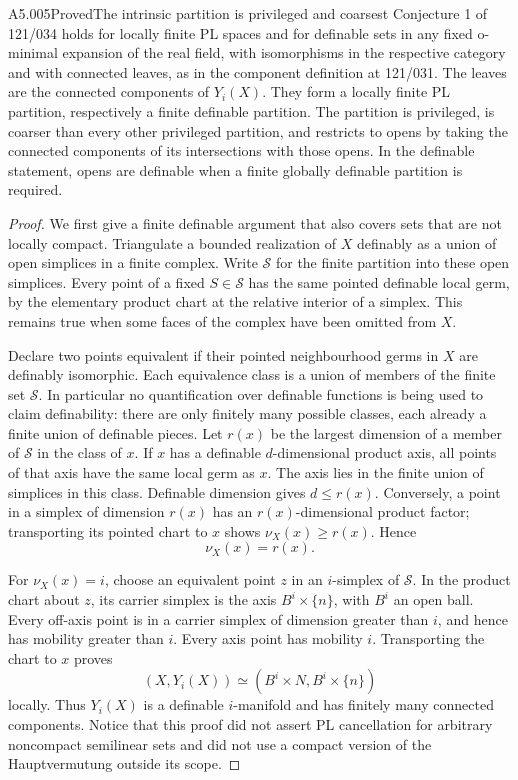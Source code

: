 \begin{saresult}{A5.005}{Proved}{The intrinsic partition is privileged and coarsest}
Conjecture 1 of 121/034 holds for locally finite PL spaces and for
definable sets in any fixed o-minimal expansion of the real field,
with isomorphisms in the respective category and with connected
leaves, as in the component definition at 121/031.  The leaves are the
connected components of $Y_i(X)$.  They form a locally finite PL
partition, respectively a finite definable partition.  The partition
is privileged, is coarser than every other privileged partition, and
restricts to opens by taking the connected components of its
intersections with those opens.  In the definable statement, opens
are definable when a finite globally definable partition is required.
\end{saresult}
\begin{proof}
We first give a finite definable argument that also covers sets that
are not locally compact.  Triangulate a bounded realization of $X$
definably as a union of open simplices in a finite complex.  Write
$\mathcal S$ for the finite partition into these open simplices.
Every point of a fixed $S\in\mathcal S$ has the same pointed
definable local germ, by the elementary product chart at the relative
interior of a simplex.  This remains true when some faces of the
complex have been omitted from $X$.

Declare two points equivalent if their pointed neighbourhood germs
in $X$ are definably isomorphic.  Each equivalence class is a union
of members of the finite set $\mathcal S$.  In particular no
quantification over definable functions is being used to claim
definability: there are only finitely many possible classes, each
already a finite union of definable pieces.  Let $r(x)$ be the
largest dimension of a member of $\mathcal S$ in the class of $x$.
If $x$ has a definable $d$-dimensional product axis, all points of
that axis have the same local germ as $x$.  The axis lies in the
finite union of simplices in this class.  Definable dimension gives
$d\leq r(x)$.  Conversely, a point in a simplex of dimension $r(x)$
has an $r(x)$-dimensional product factor; transporting its pointed
chart to $x$ shows $\nu_X(x)\geq r(x)$.  Hence
\begin{equation}\label{eq:A5-mobility-types}
                         \nu_X(x)=r(x).
\end{equation}

For $\nu_X(x)=i$, choose an equivalent point $z$ in an $i$-simplex
of $\mathcal S$.  In the product chart about $z$, its carrier
simplex is the axis $B^i\times\{n\}$, with $B^i$ an open ball.
Every off-axis point is in a carrier simplex of dimension greater
than $i$, and hence has mobility greater than $i$.  Every axis
point has mobility $i$.  Transporting the chart to $x$ proves
\[
              (X,Y_i(X))\simeq(B^i\times N,B^i\times\{n\})
\]
locally.  Thus $Y_i(X)$ is a definable $i$-manifold and has finitely
many connected components.  Notice that this proof did not assert
PL cancellation for arbitrary noncompact semilinear sets and did not
use a compact version of the Hauptvermutung outside its scope.


\end{proof}
